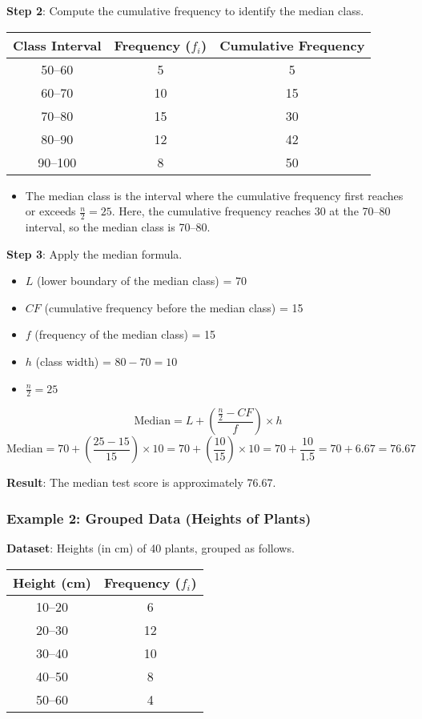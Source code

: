 \documentclass[11pt]{article}
\begin{document}
\textbf{Step 2}: Compute the cumulative frequency to identify the median class.

\begin{center}
\begin{tabular}{|c|c|c|}
\hline
\textbf{Class Interval} & \textbf{Frequency} ($f_i$) & \textbf{Cumulative Frequency} \\
\hline
50--60 & 5 & 5 \\
60--70 & 10 & 15 \\
70--80 & 15 & 30 \\
80--90 & 12 & 42 \\
90--100 & 8 & 50 \\
\hline
\end{tabular}
\end{center}

\begin{itemize}
    \item The median class is the interval where the cumulative frequency first reaches or exceeds $\frac{n}{2} = 25$. Here, the cumulative frequency reaches 30 at the 70--80 interval, so the median class is 70--80.
\end{itemize}

\textbf{Step 3}: Apply the median formula.
\begin{itemize}
    \item $L$ (lower boundary of the median class) = 70
    \item $CF$ (cumulative frequency before the median class) = 15
    \item $f$ (frequency of the median class) = 15
    \item $h$ (class width) = $80 - 70 = 10$
    \item $\frac{n}{2} = 25$
\end{itemize}

\[
\text{Median} = L + \left( \frac{\frac{n}{2} - CF}{f} \right) \times h
\]
\[
\text{Median} = 70 + \left( \frac{25 - 15}{15} \right) \times 10 = 70 + \left( \frac{10}{15} \right) \times 10 = 70 + \frac{10}{1.5} = 70 + 6.67 = 76.67
\]

\textbf{Result}: The median test score is approximately 76.67.

\subsubsection*{Example 2: Grouped Data (Heights of Plants)}
\textbf{Dataset}: Heights (in cm) of 40 plants, grouped as follows.

\begin{center}
\begin{tabular}{|c|c|}
\hline
\textbf{Height (cm)} & \textbf{Frequency} ($f_i$) \\
\hline
10--20 & 6 \\
20--30 & 12 \\
30--40 & 10 \\
40--50 & 8 \\
50--60 & 4 \\
\hline
\end{tabular}
\end{center}
\end{document}

